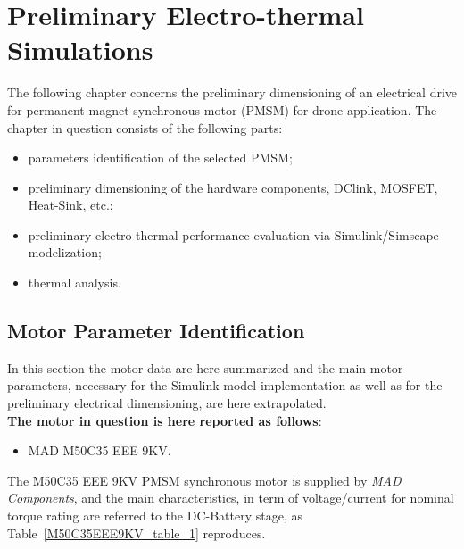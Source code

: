 \documentclass[11pt,a4paper,oneside]{book}
\title{\textbf{ 
	\begin{LARGE}
		Flying Basket Inverter Design
	\end{LARGE} \\[24pt]
	\begin{Large}
		Model, control strategy and hardware dimensioning 
	\end{Large}}
}
\author{\textbf{Davide Bagnara}}
\numberwithin{equation}{section}
\theoremstyle{it}
\theoremstyle{definition}
\begin{document}
	\thispagestyle{firstpage}
	\begin{mybox}
		\maketitle
		\vspace{120mm}
	\end{mybox}
	\newpage
	\tableofcontents
	\listoffigures	
	\listoftables
	\newpage
	

\chapter{Preliminary Electro-thermal Simulations}
The following chapter concerns the preliminary dimensioning of an electrical drive for permanent magnet synchronous motor (PMSM) for drone application. The chapter in question consists of the following parts:
\begin{itemize}
	\item[--] parameters identification of the selected PMSM;
	\item[--] preliminary dimensioning of the hardware components, DClink, MOSFET, Heat-Sink, etc.;
	\item[--] preliminary electro-thermal performance evaluation via Simulink/Simscape modelization;	
	\item[--] thermal analysis.
\end{itemize}

\section{Motor Parameter Identification}
In this section the motor data are here summarized and the main motor parameters, necessary for the Simulink model implementation as well as for the preliminary electrical dimensioning, are here extrapolated. \\

\noindent \textbf{The motor in question is here reported as follows}:
\begin{itemize}
	\item[--] MAD M50C35 EEE 9KV.
\end{itemize} 

The M50C35 EEE 9KV PMSM synchronous motor is supplied by \textit{MAD Components}, and the main characteristics, in term of voltage/current for nominal torque rating are referred to the DC-Battery stage, as Table~\ref{M50C35EEE9KV_table_1} reproduces.
\end{document}
